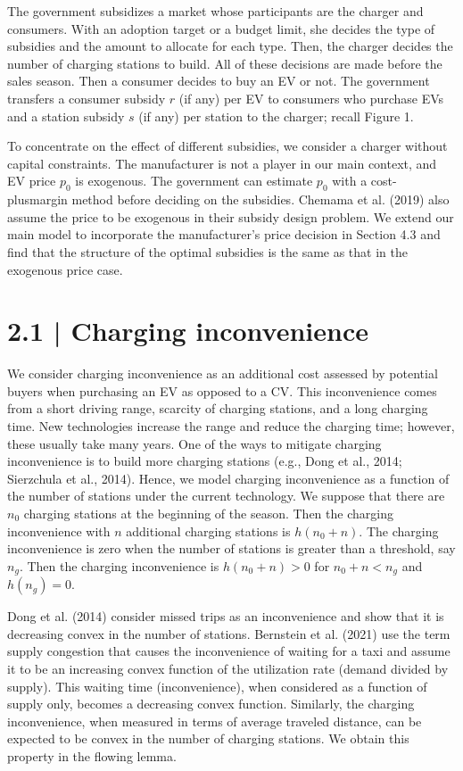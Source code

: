 \documentclass[10pt]{article}
\begin{document}
The government subsidizes a market whose participants are the charger and consumers. With an adoption target or a budget limit, she decides the type of subsidies and the amount to allocate for each type. Then, the charger decides the number of charging stations to build. All of these decisions are made before the sales season. Then a consumer decides to buy an EV or not. The government transfers a consumer subsidy $r$ (if any) per EV to consumers who purchase EVs and a station subsidy $s$ (if any) per station to the charger; recall Figure 1.

To concentrate on the effect of different subsidies, we consider a charger without capital constraints. The manufacturer is not a player in our main context, and EV price $p_{0}$ is exogenous. The government can estimate $p_{0}$ with a cost-plusmargin method before deciding on the subsidies. Chemama et al. (2019) also assume the price to be exogenous in their subsidy design problem. We extend our main model to incorporate the manufacturer's price decision in Section 4.3 and\\
find that the structure of the optimal subsidies is the same as that in the exogenous price case.

\section*{2.1 | Charging inconvenience}
We consider charging inconvenience as an additional cost assessed by potential buyers when purchasing an EV as opposed to a CV. This inconvenience comes from a short driving range, scarcity of charging stations, and a long charging time. New technologies increase the range and reduce the charging time; however, these usually take many years. One of the ways to mitigate charging inconvenience is to build more charging stations (e.g., Dong et al., 2014; Sierzchula et al., 2014). Hence, we model charging inconvenience as a function of the number of stations under the current technology. We suppose that there are $n_{0}$ charging stations at the beginning of the season. Then the charging inconvenience with $n$ additional charging stations is $h\left(n_{0}+n\right)$. The charging inconvenience is zero when the number of stations is greater than a threshold, say $n_{g}$. Then the charging inconvenience is $h\left(n_{0}+n\right)>0$ for $n_{0}+n<n_{g}$ and $h\left(n_{g}\right)=0$.

Dong et al. (2014) consider missed trips as an inconvenience and show that it is decreasing convex in the number of stations. Bernstein et al. (2021) use the term supply congestion that causes the inconvenience of waiting for a taxi and assume it to be an increasing convex function of the utilization rate (demand divided by supply). This waiting time (inconvenience), when considered as a function of supply only, becomes a decreasing convex function. Similarly, the charging inconvenience, when measured in terms of average traveled distance, can be expected to be convex in the number of charging stations. We obtain this property in the flowing lemma.
\end{document}
